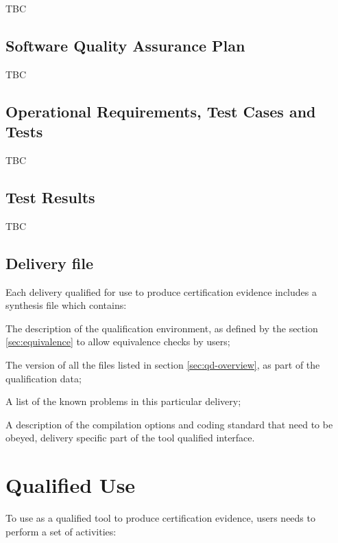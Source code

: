 \documentclass {report}
\begin{document}
TBC

\section{Software Quality Assurance Plan}

TBC

\section{Operational Requirements, Test Cases and Tests}

TBC

\section{Test Results}

TBC

\section{Delivery file}
\label{sec:delivery}

Each delivery qualified for use to produce certification evidence includes a
 synthesis file which contains:

\begin{Itemize} 
\item%
  The description of the qualification environment, as defined by the section
  \ref{sec:equivalence} to allow equivalence checks by users;
\item%
  The version of all the files listed in section \ref{sec:qd-overview}, as
  part of the qualification data;
\item%
  A list of the known problems in this particular delivery;
\item%
  A description of the \gnatp{} compilation options and coding standard that
  need to be obeyed, delivery specific part of the tool qualified interface.
\end{Itemize}

\chapter{Qualified Use}
\label{sec:qualified-use}

To use \xcov{} as a qualified tool to produce \do{} certification evidence,
users needs to perform a set of activities:
\end{document}
